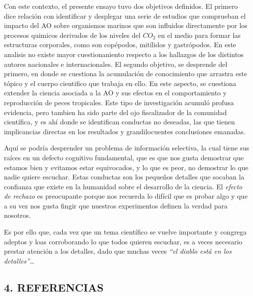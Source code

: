 \documentclass[
]{article}
\begin{document}
Con este contexto, el presente ensayo tuvo dos objetivos definidos. El
primero dice relación con identificar y desplegar una serie de estudios
que comprueban el impacto del AO sobre organismos marinos que son
influidos directamente por los procesos quimicos derivados de los
niveles del \({CO}_{2}\) en el medio para formar las estructuras
corporales, como son copépodos, mitílidos y gastrópodos. En este
analisis no existe mayor cuestionaniento respecto a los hallazgos de los
distintos autores nacionales e internacionales. El segundo objetivo, se
desprende del primero, en donde se cuestiona la acumulación de
conocimiento que arrastra este tópico y el cuerpo cientifico que trabaja
en ello. En este aspecto, se cuestiona extender la ciencia asociada a la
AO y sus efectos en el comportamiento y reproducción de peces
tropicales. Este tipo de investigación acumuló profusa evidencia, pero
tambien ha sido parte del ojo fiscalizador de la comunidad científica, y
es ahí donde se identifican conductas no deseadas, las que tienen
implicancias directas en los resultados y grandilocuentes conclusiones
emanadas.

Aquí se podría desprender un problema de información selectiva, la cual
tiene sus raíces en un defecto cognitivo fundamental, que es que nos
gusta demostrar que estamos bien y evitamos estar equivocados, y lo que
es peor, no demostrar lo que nadie quiere escuchar. Estas conductas son
los pequeños detalles que socaban la confianza que existe en la
humanidad sobre el desarrollo de la ciencia. El \emph{efecto de rechazo}
es preocupante porque nos recuerda lo difícil que es probar algo y que a
su vez nos gusta fingir que nuestros experimentos definen la verdad para
nosotros.

Es por ello que, cada vez que un tema científico se vuelve importante y
congrega adeptos y loas corroborando lo que todos quieren escuchar, es a
veces necesario prestar atención a los detalles, dado que muchas veces
\emph{``el diablo está en los detalles''}\ldots{}

\pagebreak

\hypertarget{referencias}{%
\subsection*{4. REFERENCIAS}\label{referencias}}
\end{document}
